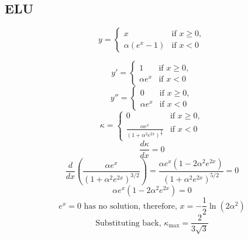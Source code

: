 \documentclass{article}
\begin{document}
\subsection{ELU}\label{app:elu}
 \begin{displaymath}
  y = \begin{cases}
  x & \text{if } x \geq 0, \\
  \alpha (e^x - 1) & \text{if } x < 0
\end{cases}
 \end{displaymath}

 \begin{displaymath}
  y' = \begin{cases}
  1 & \text{if } x \geq 0, \\
  \alpha e^x & \text{if } x < 0
\end{cases}
 \end{displaymath}
\begin{displaymath}
  y'' = \begin{cases}
  0 & \text{if } x \geq 0, \\
  \alpha e^x & \text{if } x < 0
\end{cases}
\end{displaymath}
\begin{displaymath}
  \kappa = \begin{cases}
  0 & \text{if } x \geq 0, \\
  \frac{\alpha e^x}{(1 + \alpha^2 e^{2x})^\frac{3}{2}}  & \text{if } x < 0
\end{cases}
\end{displaymath}
\begin{displaymath}
  \frac{d \kappa}{dx} = 0
\end{displaymath}
\begin{displaymath}
  \frac{d}{dx} \left( \frac{\alpha e^x}{(1 + \alpha^2 e^{2x})^{3/2}} \right)
= \frac{\alpha e^x \left( 1 - 2 \alpha^2 e^{2x} \right)}{(1 + \alpha^2 e^{2x})^{5/2}} = 0
\end{displaymath}
\begin{displaymath}
  \alpha e^x \left( 1 - 2 \alpha^2 e^{2x} \right) = 0
\end{displaymath}
\begin{displaymath}
  e^x = 0 \text{ has no solution} \text{, therefore, } x = -\frac{1}{2} \ln(2 \alpha^2)
\end{displaymath}
\begin{displaymath}
  \text{Substituting back, }\kappa_{\text{max}} = \frac{2}{3\sqrt3}
\end{displaymath}
\end{document}
